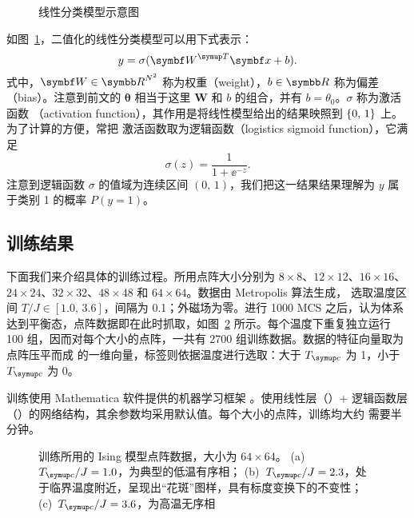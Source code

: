 \begin{figure}[htb]
  \centering
  \caption{线性分类模型示意图}
  \label{fig:linear-layer}
\end{figure}

如图~\ref{fig:linear-layer}，二值化的线性分类模型可以用下式表示：
\begin{equation}
  y = \sigma(\bm{W}^\trans \bm{x} + b).
\end{equation}
式中，$\bm{W}\in\R^{N^2}$ 称为权重（weight），$b\in\R$ 称为偏差（bias）。注意到前文的
$\bm{\theta}$ 相当于这里 $\bm{W}$ 和 $b$ 的组合，并有 $b=\theta_0$。$\sigma$ 称为激活函数
（activation function），其作用是将线性模型给出的结果映照到 ${\{0,\,1\}}$ 上。为了计算的方便，常把
激活函数取为逻辑函数（logistics sigmoid function），它满足
\begin{equation}
  \sigma(z) = \frac{1}{1+\ee^{-z}}.
\end{equation}
注意到逻辑函数 $\sigma$ 的值域为连续区间 $(0,\,1)$，我们把这一结果结果理解为 $y$ 属于类别 1
的概率 $P(y=1)$。

\subsection{训练结果}
\label{subsec:ising-linear-train-result}

下面我们来介绍具体的训练过程。所用点阵大小分别为 $8 \times 8$、$12 \times 12$、$16 \times 16$、
$24 \times 24$、$32 \times 32$、$48 \times 48$ 和 $64 \times 64$。数据由 Metropolis 算法生成，
选取温度区间 $T/J \in [1.0,\,3.6]$，间隔为 0.1；外磁场为零。进行 \num{1000} MCS 之后，认为体系
达到平衡态，点阵数据即在此时抓取，如图~\ref{fig:ising-lattice} 所示。每个温度下重复独立运行
\num{100} 组，因而对每个大小的点阵，一共有 \num{2700} 组训练数据。数据的特征向量取为点阵压平而成
的一维向量，标签则依据温度进行选取：大于 $\Tc$ 为 1，小于 $\Tc$ 为 0。

训练使用 Mathematica 软件提供的机器学习框架 \cite{nettrain}。使用线性层（）+
逻辑函数层（）的网络结构，其余参数均采用默认值。每个大小的点阵，训练均大约
需要半分钟。

\begin{figure}[htb]
  \centering
  \begin{subfigure}[b]{0.3\textwidth}
    \centering
    \caption{}
  \end{subfigure}
  \begin{subfigure}[b]{0.3\textwidth}
    \centering
    \caption{}
  \end{subfigure}
  \begin{subfigure}[b]{0.3\textwidth}
    \centering
    \caption{}
  \end{subfigure}
  \caption{训练所用的 Ising 模型点阵数据，大小为 $64 \times 64$。
    (a)~$\Tc/J=1.0$，为典型的低温有序相；
    (b)~$\Tc/J=2.3$，处于临界温度附近，呈现出“花斑”图样，具有标度变换下的不变性；
    (c)~$\Tc/J=3.6$，为高温无序相}
  \label{fig:ising-lattice}
\end{figure}

